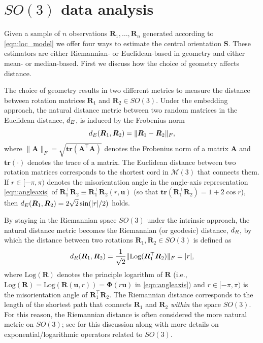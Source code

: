 \section{$SO(3)$ data analysis\label{section:analysis}}

Given a sample of $n$ observations $\bm R_1,\dots,\bm R_{n}$ generated according to \eqref{eqn:loc_model} we offer four ways to estimate the central orientation $\bm S$.  These estimators are either Riemannian- or Euclidean-based in geometry and either mean- or median-based.  First we discuss how the choice of geometry affects distance.

The choice of geometry results in two different metrics to measure the distance between rotation matrices $\bm{R}_1$ and $\bm{R}_2 \in SO(3)$. Under the embedding approach, the natural distance metric between two random matrices in the Euclidean distance, $d_E$, is induced by the Frobenius norm 
\begin{equation}
\label{d_E}
d_E(\bm{R}_1,\bm{R}_2)=\|\bm{R}_1-\bm{R}_2\|_F, 
\end{equation}
where $\|\bm{A}\|_F = \sqrt{\mathbf{tr}({\bm A^\top \bm A})}$ denotes the Frobenius norm of a matrix $\bm A$ and $\mathbf{tr}(\cdot)$ denotes the trace of a matrix.  The Euclidean distance between two rotation matrices corresponds to the shortest cord in $\mathcal{M}(3)$ that connects them.  If $r\in[-\pi,\pi)$ denotes the misorientation angle in the angle-axis representation \eqref{eqn:angleaxis} of $\bm{R}_1^\top \bm{R}_2 \equiv \bm{R}_1^\top \bm{R}_2(r,\bm{u})$ (so that $\mathbf{tr}(\bm{R}_1^\top \bm{R}_2) =1 +2 \cos r$), then $d_E(\bm{R}_1,\bm{R}_2) = 2\sqrt{2}\sin(|r|/2)$ holds.

By staying in the Riemannian space $SO(3)$ under the intrinsic approach, the natural distance metric becomes the Riemannian (or geodesic) distance, $d_R$, by which the distance between two rotations $\bm{R}_1,\bm{R}_2\in SO(3)$  is  defined as 
\begin{equation}
\label{d_R}
d_R(\bm{R}_1,\bm{R}_2)=  \frac{1}{\sqrt{2}}\|\text{Log}(\bm{R}_1^\top\bm{R}_2)\|_F = |r|,
\end{equation}
where $\text{Log}(\bm{R})$ denotes the principle logarithm of $\bm{R}$ (i.e., $\text{Log}(\bm{R}) = \text{Log}(\bm{R}(\bm u,r))= \bm \Phi(r\bm u)$ in \eqref{eqn:angleaxis}) and $r\in[-\pi,\pi)$ is the misorientation angle of $\bm{R}_1^\top \bm{R}_2$.  The Riemannian distance corresponds to the length of the shortest path that connects $\bm{R}_1$ and $\bm{R}_2$ {\it within} the space $SO(3)$. For this reason, the Riemannian distance is often considered the more natural metric on $SO(3)$; see \citet{moakher2002} for this discussion along with more details on exponential/logarithmic operators related to $SO(3)$.

